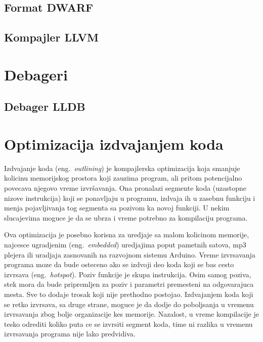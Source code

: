 \documentclass[12pt,oneside]{memoir}
\begin{document}
\section{Format DWARF}


\section{Kompajler LLVM}

\chapter{Debageri}

\section{Debager LLDB}

\chapter{Optimizacija izdvajanjem koda}

Izdvajanje koda (eng.~{\em outlining}) je kompajlerska optimizacija koja smanjuje kolicinu memorijskog prostora koji zauzima program, ali pritom potencijalno povecava njegovo vreme izvršavanja.
Ona pronalazi segmente koda (uzastopne nizove instrukcija) koji se ponavljaju u programu, izdvaja ih u zasebnu funkciju i menja pojavljivanja tog segmenta sa pozivom ka novoj funkciji.
U nekim slucajevima moguce je da se ubrza i vreme potrebno za kompilaciju programa.

Ova optimizacija je posebno korisna za uredjaje sa malom kolicinom memorije, najcesce ugradjenim (eng.~{\em embedded}) uredjajima poput pametnih satova, mp3 plejera ili uradjaja zasnovanih na razvojnom sistemu Arduino.
Vreme izvrsavanja programa moze da bude osteceno ako se izdvoji deo koda koji se bas cesto izvrsava (eng.~{\em hotspot}).
Poziv funkcije je skupa instrukcija.
Osim samog poziva, stek mora da bude pripremljen za poziv i parametri premesteni na odgovarajuca mesta.
Sve to dodaje trosak koji nije prethodno postojao.
Izdvajanjem koda koji se retko izvrsava, sa druge strane, moguce je da dodje do poboljsanja u vremenu izvrsavanja zbog bolje organizacije kes memorije.
Nazalost, u vreme kompilacije je tesko odrediti koliko puta ce se izvrsiti segment koda, time ni razlika u vremenu izvrsavanja programa nije lako predvidiva.
\end{document}
